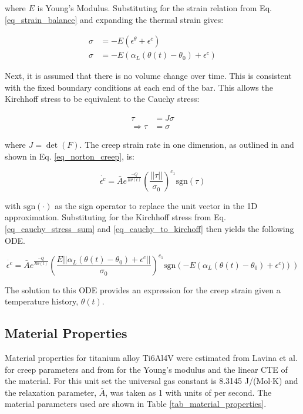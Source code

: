 \documentclass[conf]{new-aiaa}
\begin{document}
\noindent
where $E$ is Young's Modulus.
Substituting for the strain relation from Eq. \ref{eq_strain_balance} 
and expanding the thermal strain gives:

\begin{align}
\sigma &= -E \left( \epsilon^\theta + \epsilon^c \right)  \\
\sigma &= -E \left( \alpha_L (\theta(t) - \theta_0) + \epsilon^c \right) 
\label{eq_cauchy_stress_sum}
\end{align}

\noindent
Next, it is assumed that there is no volume change over time.
This is consistent with the fixed boundary conditions at 
each end of the bar.
This allows the Kirchhoff stress to be equivalent to the Cauchy stress:

\begin{align}
\tau &= J \sigma \\
\Rightarrow
  \tau &= \sigma \label{eq_cauchy_to_kirchoff}
\end{align}

\noindent
where $J=\det(F)$.
The creep strain rate in one dimension, as outlined in 
\cite{ li_simulation_of_finite_strain_inelastic_phenomena_governed_by_creep_and_plasticity}
and shown in Eq. \ref{eq_norton_creep}, is:

\begin{equation}
\dot{\epsilon^c} = \bar{A} e^{\frac{-Q}{R \theta(t)}} \left( \frac{ ||\tau||}{\sigma_0} \right)^{c_1} \text{sgn}(\tau)
\end{equation}

\noindent
with $\text{sgn}(\cdot)$ as the sign operator to replace the unit vector in the 1D approximation.
Substituting for the Kirchhoff stress from Eq. \ref{eq_cauchy_stress_sum} and \ref{eq_cauchy_to_kirchoff}
then yields the following ODE.

\begin{equation} \label{eq_creep_ode}
\dot{\epsilon^c} = \bar{A} e^{\frac{-Q}{R \theta(t)}} 
    \left( \frac{E || \alpha_L (\theta(t) - \theta_0) + \epsilon^c||}{\sigma_0} \right)^{c_1} 
    \text{sgn}\left( -E \left( \alpha_L (\theta(t) - \theta_0) + \epsilon^c) \right) \right)
\end{equation}

\noindent
The solution to this ODE provides an expression for the creep strain
given a temperature history, $\theta(t)$.


\subsection{Material Properties}
Material properties for titanium alloy Ti6Al4V were estimated from
Lavina et al. \cite{ lavina_creep_behavior_of_Ti6Al4V_from_450C_to_600C}
for creep parameters and from \cite{
boyer_materials_properties_handbook_titanium_alloys}
for the Young's modulus and the linear CTE of the material.
For this unit set the universal gas constant is 8.3145 J/(Mol$\cdot$K)
and the relaxation parameter, $\bar{A}$, was taken as 1 with units of per second.
The material parameters used are shown in Table \ref{tab_material_properties}.
\end{document}

